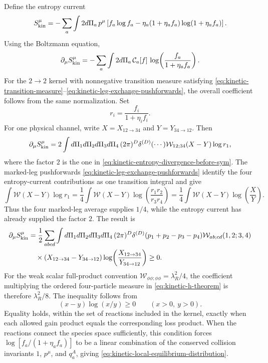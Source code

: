 Define the entropy current
\begin{equation}
  S^\mu_{\rm kin}
  =
  -\sum_a\int 2d\Pi_a\,p^\mu
  \left[
    f_a\log f_a
    -\eta_a(1+\eta_af_a)\log(1+\eta_af_a)
  \right].
  \label{eq:kinetic-entropy-current}
\end{equation}
Using the Boltzmann equation,
\begin{equation}
  \partial_\mu S^\mu_{\rm kin}
  =
  -\sum_a\int 2d\Pi_a\,\mathcal C_a[f]\,
  \log\!\left(\frac{f_a}{1+\eta_af_a}\right).
  \label{eq:kinetic-entropy-divergence-before-sym}
\end{equation}
For the \(2\to2\) kernel with nonnegative transition measure satisfying
\eqref{eq:kinetic-transition-measure}--\eqref{eq:kinetic-leg-exchange-pushforwards},
the overall coefficient follows from the same normalization.  Set
\[
  r_i=\frac{f_i}{1+\eta_i f_i}.
\]
For one physical channel, write
\(X=X_{12\to34}\) and \(Y=Y_{34\to12}\).  Then
\[
  \partial_\mu S^\mu_{\rm kin}
  =
  2\int
  d\Pi_1d\Pi_2d\Pi_3d\Pi_4\,
  (2\pi)^D\delta^{(D)}(\cdots)
  \mathcal W_{12;34}
  (X-Y)\log r_1 ,
\]
where the factor \(2\) is the one in
\eqref{eq:kinetic-entropy-divergence-before-sym}.  The
marked-leg pushforwards
\eqref{eq:kinetic-leg-exchange-pushforwards} identify the four entropy-current
contributions as one transition integral and give
\[
  \int \mathcal W(X-Y)\log r_1
  =
  \frac14\int \mathcal W(X-Y)
  \log\!\left(\frac{r_1r_2}{r_3r_4}\right)
  =
  \frac14\int \mathcal W(X-Y)\log\!\left(\frac XY\right).
\]
Thus the four marked-leg average supplies \(1/4\), while the entropy current
has already supplied the factor \(2\).  The result is
\begin{align}
  \partial_\mu S^\mu_{\rm kin}
  &=
  \frac12
  \sum_{abcd}\int
  d\Pi_1d\Pi_2d\Pi_3d\Pi_4\,
  (2\pi)^D\delta^{(D)}(p_1+p_2-p_3-p_4)
  \mathcal W_{ab;cd}(1,2;3,4)
  \nonumber\\
  &\quad\times
  (X_{12\to34}-Y_{34\to12})
  \log\!\left(\frac{X_{12\to34}}{Y_{34\to12}}\right)\ge0.
  \label{eq:kinetic-h-theorem}
\end{align}
For the weak scalar full-product convention
\(\mathcal W_{\phi\phi;\phi\phi}=\lambda_R^2/4\), the coefficient multiplying
the ordered four-particle measure in
\eqref{eq:kinetic-h-theorem} is therefore \(\lambda_R^2/8\).
The inequality follows from
\[
  (x-y)\log(x/y)\ge0
  \qquad
  (x>0,\ y>0).
\]
Equality holds, within the set of reactions included in the kernel, exactly
when each allowed gain product equals the corresponding loss product.  When
the reactions connect the species space sufficiently, this condition forces
\(\log[f_a/(1+\eta_af_a)]\) to be a linear combination of the conserved
collision invariants \(1\), \(p^\mu\), and \(q_a^A\), giving
\eqref{eq:kinetic-local-equilibrium-distribution}.

